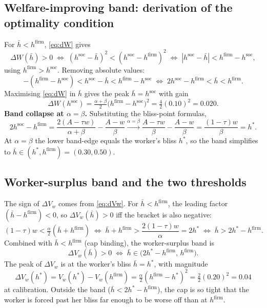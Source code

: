 \documentclass[a4paper,11pt]{article}
\begin{document}
\subsection{Welfare-improving band: derivation of the optimality condition}
For $\bar h<h^{\mathrm{firm}}$, \eqref{eq:dW} gives
\[
\Delta W(\bar h)>0 \;\Longleftrightarrow\; (h^{\mathrm{soc}}-\bar h)^{2}<(h^{\mathrm{soc}}-h^{\mathrm{firm}})^{2}
\;\Longleftrightarrow\; |h^{\mathrm{soc}}-\bar h|<h^{\mathrm{firm}}-h^{\mathrm{soc}},
\]
using $h^{\mathrm{firm}}>h^{\mathrm{soc}}$. Removing absolute values:
\[
-(h^{\mathrm{firm}}-h^{\mathrm{soc}})<h^{\mathrm{soc}}-\bar h<h^{\mathrm{firm}}-h^{\mathrm{soc}}
\;\Longleftrightarrow\;
2h^{\mathrm{soc}}-h^{\mathrm{firm}}<\bar h<h^{\mathrm{firm}}.
\]
Maximising \eqref{eq:dW} in $\bar h$ gives the peak $\bar h=h^{\mathrm{soc}}$ with gain
\[
\Delta W(h^{\mathrm{soc}})=\tfrac{\alpha+\beta}{2}\bigl(h^{\mathrm{firm}}-h^{\mathrm{soc}}\bigr)^{2}=\tfrac{4}{2}(0.10)^{2}=0.020.
\]
\textbf{Band collapse at $\alpha=\beta$.} Substituting the bliss-point formulas,
\[
2h^{\mathrm{soc}}-h^{\mathrm{firm}}=\frac{2(A-\tau w)}{\alpha+\beta}-\frac{A-w}{\beta}\xrightarrow{\alpha=\beta}\frac{A-\tau w}{\beta}-\frac{A-w}{\beta}=\frac{(1-\tau)w}{\beta}=h^{*}.
\]
At $\alpha=\beta$ the lower band-edge equals the worker's bliss $h^{*}$, so the band simplifies to $\bar h\in(h^{*},h^{\mathrm{firm}})=(0.30,0.50)$.

\subsection{Worker-surplus band and the two thresholds}
The sign of $\Delta V_w$ comes from \eqref{eq:dVw}. For $\bar h<h^{\mathrm{firm}}$, the leading factor $(\bar h-h^{\mathrm{firm}})<0$, so $\Delta V_w(\bar h)>0$ iff the bracket is also negative:
\[
(1-\tau)w<\tfrac{\alpha}{2}(\bar h+h^{\mathrm{firm}})
\;\Longleftrightarrow\;
\bar h+h^{\mathrm{firm}}>\frac{2(1-\tau)w}{\alpha}=2h^{*}
\;\Longleftrightarrow\;
\bar h>2h^{*}-h^{\mathrm{firm}}.
\]
Combined with $\bar h<h^{\mathrm{firm}}$ (cap binding), the worker-surplus band is
\[
\Delta V_w(\bar h)>0\;\Longleftrightarrow\;\bar h\in\bigl(2h^{*}-h^{\mathrm{firm}},\,h^{\mathrm{firm}}\bigr).
\]
The peak of $\Delta V_w$ is at the worker's bliss $\bar h=h^{*}$, with magnitude
\[
\Delta V_w(h^{*})=V_w(h^{*})-V_w(h^{\mathrm{firm}})=\tfrac{\alpha}{2}(h^{\mathrm{firm}}-h^{*})^{2}=\tfrac{2}{2}(0.20)^{2}=0.04
\]
at calibration. Outside the band ($\bar h<2h^{*}-h^{\mathrm{firm}}$), the cap is so tight that the worker is forced past her bliss far enough to be worse off than at $h^{\mathrm{firm}}$.
\end{document}
